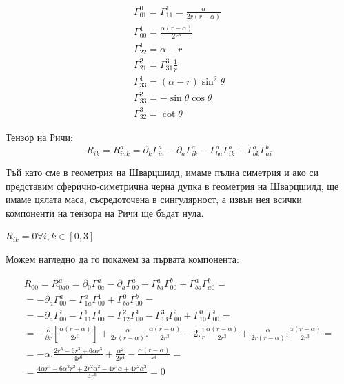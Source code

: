 \documentclass[a4paper,12pt]{article}
\begin{document}
    \begin{equation*}
        \begin{aligned}
        \varGamma^0_{01} = \varGamma^1_{11} = \frac{\alpha}{2r(r-\alpha)} \\ 
        \varGamma^1_{00} = \frac{\alpha(r-\alpha)}{2r^3} \\ 
        \varGamma^1_{22} = \alpha - r \\
        \varGamma^2_{21} = \varGamma^3_{31}\frac{1}{r} \\
        \varGamma^1_{33} = (\alpha - r)\sin^2\theta \\
        \varGamma^2_{33} = - \sin\theta\cos\theta \\
        \varGamma^3_{32} = \cot\theta
    \end{aligned}
    \end{equation*}

    Тензор на Ричи:
    \begin{equation*}
        R_{ik} = R^a_{iak} = \partial_k\varGamma^a_{ia} - \partial_a\varGamma^a_{ik}-\varGamma^a_{ba}\varGamma^b_{ik} + \varGamma^a_{bk}\varGamma^b_{ai}
    \end{equation*}

    Тъй като сме в геометрия на Шварцшилд, имаме пълна симетрия и ако си представим
    сферично-симетрична черна дупка в геометрия на Шварцшилд, ще имаме 
    цялата маса, съсредоточена в сингулярност, а извън нея всички компоненти на тензора на 
    Ричи ще бъдат нула.

    $R_{ik}=0 \forall i, k \in [0, 3]$

    Можем нагледно да го покажем за първата компонента:

    \begin{equation*}
        \begin{aligned}
            R_{00}=R^a_{0a0} = \partial_0\varGamma^a_{0a} - \partial_a\varGamma^a_{00}-\varGamma^a_{ba}\varGamma^b_{00}+\varGamma^a_{bo}\varGamma^b_{a0}=\\
            = - \partial_a\varGamma^a_{00} - \varGamma^a_{1a}\varGamma^1_{00}+\varGamma^0_{bo}\varGamma^b_{00} =\\
            = -\partial_a\varGamma^1_{00}-\varGamma^1_{11}\varGamma^1_{00}-\varGamma^2_{12}\varGamma^1_{00}-\varGamma^3_{13}\varGamma^1_{00}+\varGamma^0_{10}\varGamma^1_{00} = \\
            =- \frac{\partial}{\partial r}\left[ \frac{\alpha(r-\alpha)}{2r^3} \right] + \frac{\alpha}{2r(r-\alpha)}.\frac{\alpha(r-\alpha)}{2r^3}-2.\frac{1}{r}\frac{\alpha(r-\alpha)}{2r^3}
            + \frac{\alpha}{2r(r-\alpha)}.\frac{\alpha(r-\alpha)}{2r^3} = \\
            = -\alpha.\frac{2r^3 - 6r^3+6\alpha r^3}{4r^6} + \frac{\alpha^2}{2r^4} - \frac{\alpha(r-\alpha)}{r^4} = \\
            = \frac{4\alpha r^3 - 6 \alpha^2 r^2 + 2r^2\alpha^2-4r^3\alpha+4r^2\alpha^2}{4r^6} = 0
        \end{aligned}
    \end{equation*}
\end{document}
